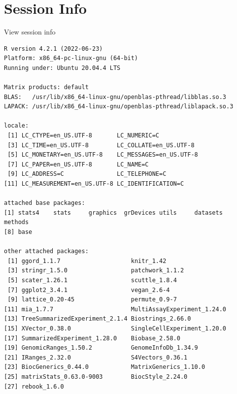 \documentclass[
]{book}
\begin{document}
\hypertarget{session-info-5}{%
\section*{Session Info}\label{session-info-5}}

View session info

\begin{verbatim}
R version 4.2.1 (2022-06-23)
Platform: x86_64-pc-linux-gnu (64-bit)
Running under: Ubuntu 20.04.4 LTS

Matrix products: default
BLAS:   /usr/lib/x86_64-linux-gnu/openblas-pthread/libblas.so.3
LAPACK: /usr/lib/x86_64-linux-gnu/openblas-pthread/liblapack.so.3

locale:
 [1] LC_CTYPE=en_US.UTF-8       LC_NUMERIC=C              
 [3] LC_TIME=en_US.UTF-8        LC_COLLATE=en_US.UTF-8    
 [5] LC_MONETARY=en_US.UTF-8    LC_MESSAGES=en_US.UTF-8   
 [7] LC_PAPER=en_US.UTF-8       LC_NAME=C                 
 [9] LC_ADDRESS=C               LC_TELEPHONE=C            
[11] LC_MEASUREMENT=en_US.UTF-8 LC_IDENTIFICATION=C       

attached base packages:
[1] stats4    stats     graphics  grDevices utils     datasets  methods  
[8] base     

other attached packages:
 [1] ggord_1.1.7                    knitr_1.42                    
 [3] stringr_1.5.0                  patchwork_1.1.2               
 [5] scater_1.26.1                  scuttle_1.8.4                 
 [7] ggplot2_3.4.1                  vegan_2.6-4                   
 [9] lattice_0.20-45                permute_0.9-7                 
[11] mia_1.7.7                      MultiAssayExperiment_1.24.0   
[13] TreeSummarizedExperiment_2.1.4 Biostrings_2.66.0             
[15] XVector_0.38.0                 SingleCellExperiment_1.20.0   
[17] SummarizedExperiment_1.28.0    Biobase_2.58.0                
[19] GenomicRanges_1.50.2           GenomeInfoDb_1.34.9           
[21] IRanges_2.32.0                 S4Vectors_0.36.1              
[23] BiocGenerics_0.44.0            MatrixGenerics_1.10.0         
[25] matrixStats_0.63.0-9003        BiocStyle_2.24.0              
[27] rebook_1.6.0                  


\end{verbatim}
\end{document}
